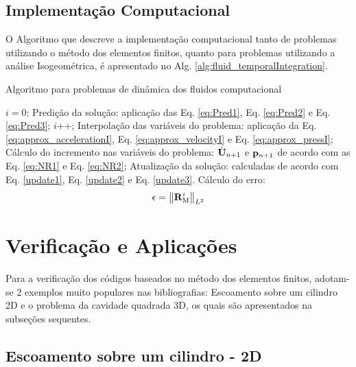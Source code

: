 \documentclass[tese_patricia]{subfiles}%
\begin{document}
\clearpage



\subsection{Implementação Computacional} \label{subsection:DFCComputationalCode}


O Algoritmo que descreve a implementação computacional tanto de problemas utilizando o método dos elementos finitos, quanto para problemas utilizando a análise Isogeométrica, é apresentado no Alg. \ref{alg:fluid_temporalIntegration}.

\begin{algorithm}
	\caption{Algoritmo para problemas de dinâmica dos fluidos computacional}
	\label{alg:fluid_temporalIntegration}
	\begin{algorithmic}[1]
		\State $i=0$;
		\State Predição da solução: aplicação das Eq. \eqref{eq:Pred1}, Eq. \eqref{eq:Pred2} e Eq. \eqref{eq:Pred3};
		\State $i$++;
		\State Interpolação das variáveis do problema: aplicação da Eq. \eqref{eq:approx_accelerationI}, Eq. \eqref {eq:approx_velocityI} e Eq. \eqref{eq:approx_pressI};
		\State Cálculo do incremento nas variáveis do problema: $\dot{\mathbf{U}}_{n+1}$ e $\mathbf{p}_{n+1}$ de acordo com as Eq. \eqref{eq:NR1} e Eq. \eqref{eq:NR2};
		\State Atualização da solução: calculadas de acordo com Eq. \eqref{update1}, Eq. \eqref{update2} e Eq. \eqref{update3}.
		\State Cálculo do erro:
		\begin{align}
		\epsilon =\left\| \mathbf{R}_\mathrm{M}^i \right\|_{L^2}
		\end{align}
		\EndWhile
		\EndFor
	\end{algorithmic}
\end{algorithm}

\section{Verificação e Aplicações}

Para a verificação dos códigos baseados no método dos elementos finitos, adotam-se 2 exemplos muito populares nas bibliografias: Escoamento sobre um cilindro 2D e o problema da cavidade quadrada 3D, os quais são apresentados na subseções sequentes.

\subsection{Escoamento sobre um cilindro - 2D} \label{subsection:escoamentocil2d}
\end{document}
